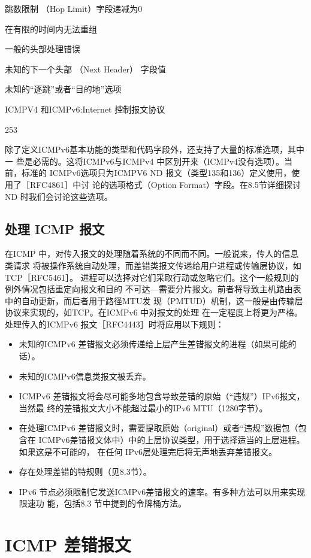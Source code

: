 跳数限制 （Hop Limit）字段递减为0

在有限的时间内无法重组

一般的头部处理错误

未知的下一个头部 （Next Header） 字段值

未知的“逐跳”或者“目的地”选项

ICMPV4 和ICMPv6:Internet 控制报文协议

253

除了定义ICMPv6基本功能的类型和代码字段外，还支持了大量的标准选项，其中一
些是必需的。这将ICMPv6与ICMPv4 中区别开来（ICMPv4没有选项）。当前，标准的
ICMPv6选项只为ICMPV6 ND 报文（类型135和136）定义使用，使用了［RFC4861］中讨
论的选项格式（Option Format）字段。在8.5节详细探讨ND 时我们会讨论这些选项。

\subsection{处理 ICMP 报文}
在ICMP 中，对传入报文的处理随着系统的不同而不同。一般说来，传人的信息类请求
将被操作系统自动处理，而差错类报文传递给用户进程或传输层协议，如 TCP［RFC5461］。
进程可以选择对它们采取行动或忽略它们。这个一般规则的例外情况包括重定向报文和目的
不可达—需要分片报文。前者将导致主机路由表中的自动更新，而后者用于路径MTU发
现（PMTUD）机制，这一般是由传输层协议来实现的，如TCP。在ICMPv6 中对报文的处理
在一定程度上将更为严格。处理传入的ICMPv6 报文［RFC4443］时将应用以下规则：

\begin{itemize}
	\item 未知的ICMPv6 差错报文必须传递给上层产生差错报文的进程（如果可能的话）。
	\item 未知的ICMPv6信息类报文被丢弃。
	\item ICMPv6 差错报文将会尽可能多地包含导致差错的原始（“违规”）IPv6报文，当然最
	      终的差错报文大小不能超过最小的IPv6 MTU（1280字节）。
	\item 在处理ICMPv6 差错报文时，需要提取原始（original）或者“违规”数据包（包含在
	      ICMPv6差错报文体中）中的上层协议类型，用于选择适当的上层进程。如果这是不可能的，
	      在任何 IPv6层处理完后将无声地丢弃差错报文。
	\item 存在处理差错的特规则（见8.3节）。
	\item IPv6 节点必须限制它发送ICMPv6差错报文的速率。有多种方法可以用来实现限速功
	      能，包括8.3 节中提到的令牌桶方法。
\end{itemize}

\section{ICMP 差错报文}

